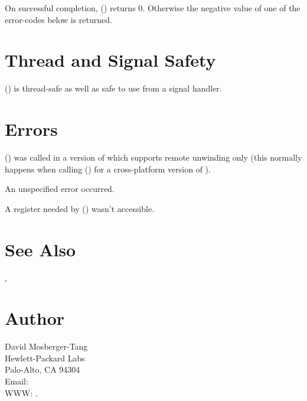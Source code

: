 \documentclass{article}
\begin{document}
On successful completion, () returns 0.
Otherwise the negative value of one of the error-codes below is
returned.

\section{Thread and Signal Safety}

() is thread-safe as well as safe to use from a
signal handler.

\section{Errors}

\begin{Description}
\item[\Const{UNW\_EINVAL}] () was called in a
  version of  which supports remote unwinding only
  (this normally happens when calling () for a
  cross-platform version of ).
\item[\Const{UNW\_EUNSPEC}] An unspecified error occurred.
\item[\Const{UNW\_EBADREG}] A register needed by ()
  wasn't accessible.
\end{Description}

\section{See Also}

, 

\section{Author}

\noindent
David Mosberger-Tang\\
Hewlett-Packard Labs\\
Palo-Alto, CA 94304\\
Email: \\
WWW: .
\LatexManEnd
\end{document}
